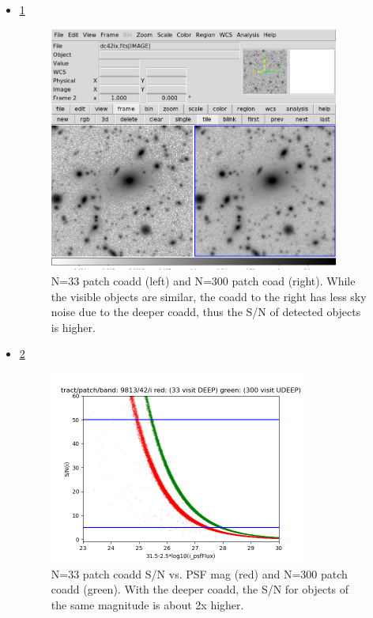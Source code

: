 \begin{itemize}
\item \ref{fig:coadd}  

 \begin{figure}[h]
 \includegraphics[width=0.9\textwidth]{sidebyside9813p42bi.png}
	 \caption{N=33 patch coadd (left) and N=300 patch coad (right).  While the visible objects are similar, the coadd to the right has less sky noise due to the deeper coadd, thus the S/N of detected objects is higher.  \label{fig:coadd}}
 \end{figure}


\item \ref{fig:s2n}

 \begin{figure}[h]
 \includegraphics[width=0.8\textwidth,natwidth=600,natheight=600]{redgreen31.5.png}
	 \caption{N=33 patch coadd S/N vs. PSF mag (red) and N=300 patch coadd (green).  With the deeper coadd, the S/N for objects of the same magnitude is about 2x higher.  \label{fig:s2n}}
 \end{figure}


\end{itemize}
